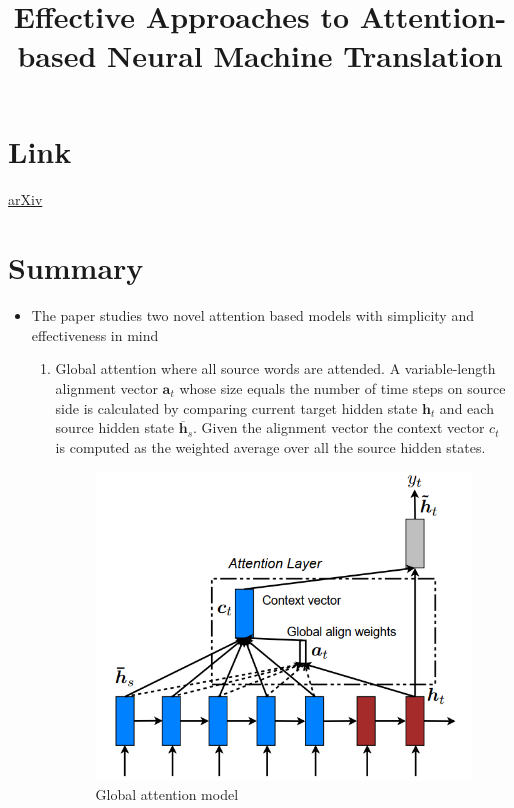 \documentclass{article}
\title{Effective Approaches to Attention-based Neural Machine Translation}
\author{}
\date{}
\begin{document}
\maketitle

\section*{Link}
\href{https://arxiv.org/abs/1404.2188}{arXiv} 

\section*{Summary}
\begin{itemize}
    \item The paper studies two novel attention based models with simplicity and effectiveness in mind
    \begin{enumerate}
        \item Global attention where all source words are attended. A variable-length alignment vector $\textbf{a}_t$ whose size equals the number of time steps on source side is calculated by comparing current target hidden state $\textbf{h}_t$ and each source hidden state $\overline{\textbf{h}}_s$. Given the alignment vector the context vector $c_t$ is computed as the weighted average over all the source hidden states.
        \begin{figure}[H]
            \centering
            \includegraphics[scale=0.7]{global_attention.png}
            \caption{Global attention model}
            \label{fig:Figure 1}

\end{figure}
\end{enumerate}
\end{itemize}
\end{document}
